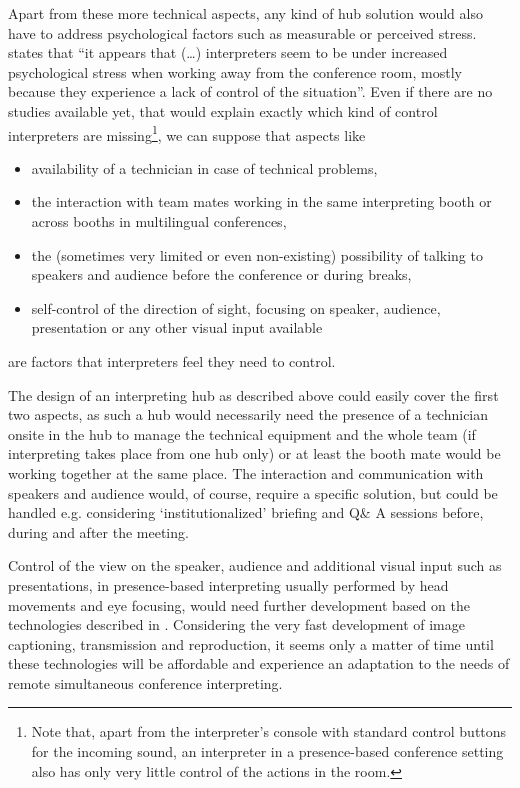 \documentclass[output=paper]{langsci/langscibook}
\begin{document}
Apart from these more technical aspects, any kind of hub solution would also have to address psychological factors such as measurable or perceived stress. \citet[15]{Moser-Mercer2005} states that “it appears that (…) interpreters seem to be under increased psychological stress when working away from the conference room, mostly because they experience a lack of control of the situation”. Even if there are no studies available yet, that would explain exactly which kind of control interpreters are missing\footnote{Note that, apart from the interpreter’s console with standard control buttons for the incoming sound, an interpreter in a presence-based conference setting also has only very little control of the actions in the room.}, we can suppose that aspects like

\begin{itemize}
\item availability of a technician in case of technical problems,
\item the interaction with team mates working in the same interpreting booth or across booths in multilingual conferences,
\item the (sometimes very limited or even non-existing) possibility of talking to speakers and audience before the conference or during breaks,
\item self-control of the direction of sight, focusing on speaker, audience, presentation or any other visual input available
\end{itemize}

are factors that interpreters feel they need to control.

The design of an interpreting hub as described above could easily cover the first two aspects, as such a hub would necessarily need the presence of a technician onsite in the hub to manage the technical equipment and the whole team (if interpreting takes place from one hub only) or at least the booth mate would be working together at the same place. 
The interaction and communication with speakers and audience would, of course, require a specific solution, but could be handled e.g. considering ‘institutionalized’ briefing and Q\& A sessions before, during and after the meeting.

Control of the view on the speaker, audience and additional visual input such as presentations, in presence-based interpreting usually performed by head movements and eye focusing, would need further development based on the technologies described in . Considering the very fast development of image captioning, transmission and reproduction, it seems only a matter of time until these technologies will be affordable and experience an adaptation to the needs of remote simultaneous conference interpreting. 
\end{document}
